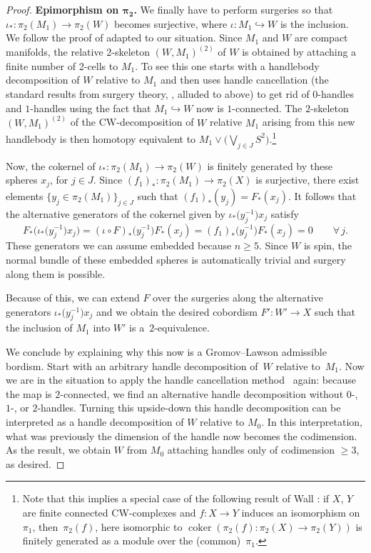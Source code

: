 \documentclass[10pt,a4paper]{amsart}
\numberwithin{equation}{section}
\newcommand{\into}{\hookrightarrow}
\DeclareMathOperator{\coker}{coker}
\begin{document}
\begin{proof}
 \textbf{Epimorphism on $\boldsymbol{\pi_2}$.} We finally have to perform surgeries so
 that $\iota_*\colon \pi_2(M_1)\to \pi_2(W)$ becomes surjective, where
 $\iota\colon M_1\into W$ is the inclusion. We follow the proof of \cite[Lemma~5.6]{Stolz} adapted to our situation.
 Since $M_1$ and $W$ are compact manifolds, the relative 2-skeleton
 $(W,M_1)^{(2)}$ of $W$ is obtained by attaching a finite number of 2-cells
 to $M_{1}$. To see this one starts with a handlebody decomposition of $W$
 relative to $M_1$ and then uses handle cancellation (the standard results
 from surgery theory, \cite{Wall}, alluded to above) to get rid of $0$-handles and $1$-handles
 using the fact that $M_1\into W$ now is $1$-connected. The $2$-skeleton
 $(W,M_1)^{(2)}$ of
 the CW-decomposition of $W$ relative $M_1$ arising from this new handlebody
 is then homotopy equivalent to $M_{1}\vee\big(\bigvee_{j\in J}
 S^2\big)$.\footnote{Note that this implies a special case of the following
 result of Wall \cite[proof of Lemma~1.1]{Wall_finite}: if $X$, $Y$ are finite connected
 CW-complexes and $f\colon X\to Y$ induces an isomorphism on $\pi_1$,
 then~$\pi_2(f)$, here isomorphic to $\coker(\pi_2(f)\colon \pi_2(X)\to
 \pi_2(Y))$ is finitely generated as a module over the (common)~$\pi_1$.}

 Now, the cokernel of $\iota_*\colon \pi_2(M_1)\to \pi_2(W)$
 is finitely generated by these spheres $x_j$, for $j\in J$. Since $(f_1)_*\colon \pi_2(M_1)\to \pi_2(X)$ is surjective, there exist
 elements $\{y_j\in \pi_2(M_1)\}_{j\in J}$ such that $(f_1)_*(y_j)=F_*(
 x_j)$. It follows that the alternative generators of the cokernel given by $\iota_*\big(y_j^{-1}\big) x_j$ satisfy
 \[F_*\big(\iota_*\big(y_j^{-1}\big) x_j\big)=(\iota\circ
 F)_*\big(y_j^{-1}\big)F_*(x_j)=(f_1)_*\big(y^{-1}_j\big)F_*(x_j)=0\qquad\forall\, j.\]
 These generators we can
 assume embedded because $n\ge 5$. Since $W$ is spin, the normal
 bundle of these embedded spheres is automatically trivial and surgery
 along them is possible.

Because of this, we can extend $F$ over the surgeries along
 the alternative generators $\iota_*\big(y_j^{-1}\big) x_j$ and we obtain
 the desired cobordism ${F'}\colon W'\to X$ such that the
 inclusion of $M_1$ into $W'$ is a~$2$-equivalence.

 We conclude by explaining why this now is a Gromov--Lawson admissible
 bordism. Start with an arbitrary handle decomposition of~$W$ relative to~$M_1$.
 Now we are in the situation to apply the handle cancellation method~\cite{Wall} again: because the map is $2$-connected, we find an alternative
 handle decomposition without $0$-, $1$-, or $2$-handles. Turning this
 upside-down this handle decomposition can be interpreted as a handle
 decomposition of $W$ relative to $M_0$. In this interpretation, what was
 previously the dimension of the handle now becomes the codimension. As the
 result, we obtain $W$ from $M_0$ attaching handles only of codimension $\ge
 3$, as desired.
\end{proof}
\end{document}
